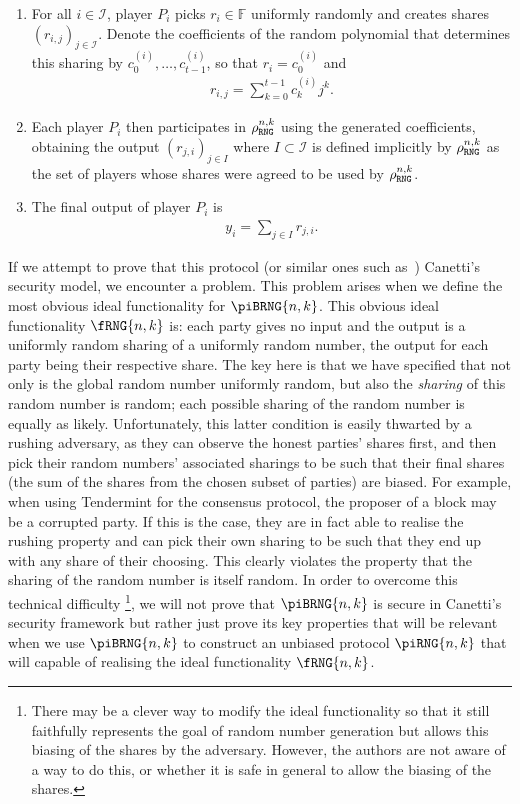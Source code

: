\documentclass{article}
\theoremstyle{remark}
\newcommand{\F}{\mathbb{F}}
\begin{document}
\begin{enumerate}
	\item For all $i \in \mathcal{I}$, player $P_i$ picks $r_i \in \F$
		uniformly randomly and creates shares ${(r_{i,j})}_{j \in
		\mathcal{I}}$.  Denote the coefficients of the random polynomial that
		determines this sharing by $c_0^{(i)}, \ldots, c_{t-1}^{(i)}$, so that
		$r_i = c_0^{(i)}$ and
		\begin{align*}
			r_{i, j} = \sum_{k=0}^{t-1} c_k^{(i)} j^k.
		\end{align*}

	\item Each player $P_i$ then participates in $\rho_\texttt{RNG}^{n, k}$ using the
		generated coefficients, obtaining the output ${(r_{j, i})}_{j \in
		I}$ where $I \subset \mathcal{I}$ is defined implicitly by
		$\rho_\texttt{RNG}^{n, k}$ as the set of players whose shares were agreed to be
		used by $\rho_\texttt{RNG}^{n, k}$.

	\item The final output of player $P_i$ is
		\begin{align*}
			y_i = \sum_{j \in I} r_{j, i}.
		\end{align*}
\end{enumerate}

If we attempt to prove that this protocol (or similar ones such
as~\cite{gjkr96}) Canetti's security model, we encounter a problem. This
problem arises when we define the most obvious ideal functionality for
$\piBRNG{n,k}$. This obvious ideal functionality $\fRNG{n,k}$ is: each party
gives no input and the output is a uniformly random sharing of a uniformly
random number, the output for each party being their respective share. The key
here is that we have specified that not only is the global random number
uniformly random, but also the \textit{sharing} of this random number is
random; each possible sharing of the random number is equally as likely.
Unfortunately, this latter condition is easily thwarted by a rushing adversary,
as they can observe the honest parties' shares first, and then pick their
random numbers' associated sharings to be such that their final shares (the sum
of the shares from the chosen subset of parties) are biased. For example, when
using Tendermint for the consensus protocol, the proposer of a block may be a
corrupted party. If this is the case, they are in fact able to realise the
rushing property and can pick their own sharing to be such that they end up
with any share of their choosing. This clearly violates the property that the
sharing of the random number is itself random. In order to overcome this
technical difficulty%
\footnote{%
	There may be a clever way to modify the ideal functionality so that it
	still faithfully represents the goal of random number generation but allows
	this biasing of the shares by the adversary. However, the authors are not
	aware of a way to do this, or whether it is safe in general to allow the
	biasing of the shares.
}, we will not prove that $\piBRNG{n,k}$ is secure in
Canetti's security framework but rather just prove its key properties that will
be relevant when we use $\piBRNG{n,k}$ to construct an unbiased protocol
$\piRNG{n,k}$ that will capable of realising the ideal functionality
$\fRNG{n,k}$.
\end{document}
